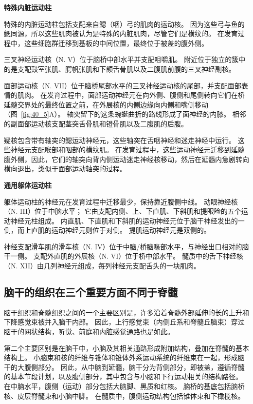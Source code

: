 \textbf{特殊内脏运动柱}

特殊的内脏运动柱包括支配来自鳃（咽）弓的肌肉的运动核。
因为这些弓与鱼的鳃同源，所以这些肌肉被认为是特殊的内脏肌肉，尽管它们是横纹的。
在发育过程中，这些细胞群迁移到基板的中间位置，最终位于被盖的腹外侧。


三叉神经运动核（N. V）位于脑桥中部水平并支配咀嚼肌。
附近位于独立的簇中的是支配鼓室张肌、腭帆张肌和下颌舌骨肌以及二腹肌前腹的三叉神经副核。


面部运动核（N. VII）位于脑桥尾部水平的三叉神经运动核的尾部，并支配面部表情的肌肉。
在发育过程中，面部运动神经元在向外侧、腹侧和尾侧转向它们在桥延髓交界处的最终位置之前，在外展核的内侧边缘向内侧和嘴侧移动（图~\ref{fig:40_5}A）。
轴突留下的这条蜿蜒曲折的路线形成了面神经的内膝。
相邻的副面部运动核支配茎突舌骨肌和镫骨肌以及二腹肌的后腹。


疑核包含带有轴突的鳃运动神经元，这些轴突在舌咽神经和迷走神经中运行。
这些神经元支配喉部和咽部的横纹肌。
在发育过程中，这些运动神经元迁移到延髓腹外侧，因此，它们的轴突向背内侧运动迷走神经核移动，然后在延髓内急剧转向横向退出，类似于面部运动轴突的过程。


\textbf{通用躯体运动柱}

躯体运动柱的神经元在发育过程中迁移最少，保持靠近腹侧中线。
动眼神经核（N. III）位于中脑水平；
它由支配内侧、上、下直肌、下斜肌和提眼睑的五个运动神经元柱组成。
内直肌、下直肌和下斜肌的运动神经元位于脑干神经发出的一侧，而上直肌的运动神经元则位于对侧。
提肌运动神经元是双侧的。


神经支配滑车肌的滑车核（N. IV）位于中脑/桥脑喙部水平，与神经出口相对的脑干一侧。
支配外直肌的外展核（N. VI）位于桥中部水平。
髓质中的舌下神经核（N. XII）由几列神经元组成，每列神经元支配舌头的一块肌肉。



\subsection{脑干的组织在三个重要方面不同于脊髓}

脑干组织和脊髓组织之间的一个主要区别是，许多沿着脊髓外部延伸的长的上升和下降感觉束被并入脑干内部。
因此，上行感觉束（内侧丘系和脊髓丘脑束）穿过脑干的网状结构，听觉、前庭和内脏感觉通路也是如此。


第二个主要区别是在脑干中，小脑及其相关通路形成附加结构，叠加在脊髓的基本结构上。
小脑束和核的纤维与锥体和锥体外系运动系统的纤维束在一起，形成脑干的大腹侧部分。
因此，从中脑到延髓，脑干分为背侧部分，即被盖，遵循脊髓的基本节段计划，以及腹侧部分，其中包含与小脑和下行运动相关的结构路径。
在中脑水平，腹侧（运动）部分包括大脑脚、黑质和红核。
脑桥的基底包括脑桥核、皮层脊髓束和小脑中脚。
在髓质中，腹侧运动结构包括锥体束和下橄榄核。



